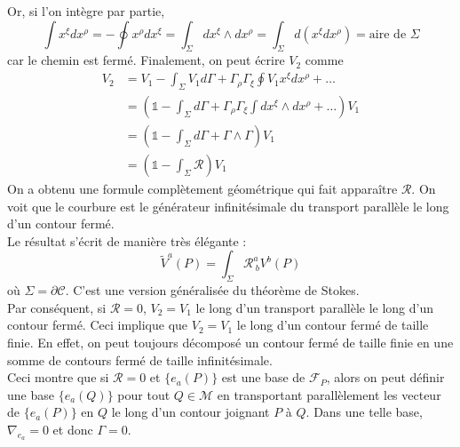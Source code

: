 \documentclass[a4paper,11pt]{report}
\theoremstyle{definition}
\theoremstyle{plain}
\theoremstyle{definition}
\theoremstyle{remark}
\newcommand{\M}{\mathscr{M}}
\newcommand{\F}{\mathcal{F}}
\newcommand{\p}{\partial}
\begin{document}
                Or, si l'on intègre par partie,
                \begin{equation}
                    \int x^\xi dx^\rho = -\oint x^\rho dx^\xi = \int_\Sigma dx^\xi\wedge dx^\rho = \int_\Sigma d(x^\xi dx^\rho) = \text{aire de }\Sigma
                \end{equation}
                car le chemin est fermé. Finalement, on peut écrire $V_2$ comme
                \begin{align}
                    V_2 &= V_1-\int_\Sigma V_1 d\Gamma + \Gamma_\rho\Gamma_\xi\oint V_1x^\xi dx^\rho +\dots\\
                    &= \left( \mathbb{1}-\int_\Sigma d\Gamma + \Gamma_\rho\Gamma_\xi \int dx^\xi\wedge dx^\rho+\dots \right)V_1 \\
                    &= \left( \mathbb{1}-\int_\Sigma d\Gamma+\Gamma\wedge\Gamma \right)V_1 \\
                    &= \left( \mathbb{1}-\int_\Sigma \mathscr{R} \right)V_1
                \end{align}
                On a obtenu une formule complètement géométrique qui fait apparaître $\mathscr{R}$. On voit que le courbure est le générateur infinitésimale du transport parallèle le long d'un contour fermé.\\
                
                Le résultat s'écrit de manière très élégante :
                \begin{equation}
                    \widetilde{V}^a(P) = \int_\Sigma \mathscr{R}^a_{~b} V^b(P)
                \end{equation}
                où $\Sigma = \p\mathscr{C}$. C'est une version généralisée du théorème de Stokes.\\
                
                Par conséquent, si $\mathscr{R} = 0$, $V_2 = V_1$ le long d'un transport parallèle le long d'un contour fermé. Ceci implique que $V_2 = V_1$ le long d'un contour fermé de taille finie. En effet, on peut toujours décomposé un contour fermé de taille finie en une somme de contours fermé de taille infinitésimale.\\
                
                Ceci montre que si $\mathscr{R} = 0$ et $\{e_a(P)\}$ est une base de $\F_P$, alors on peut définir une base $\{e_a(Q)\}$ pour tout $Q\in\M$ en transportant parallèlement les vecteur de $\{e_a(P)\}$ en $Q$ le long d'un contour joignant $P$ à $Q$. Dans une telle base, $\nabla_{e_a} = 0$ et donc $\Gamma = 0$.\\
                
\end{document}

